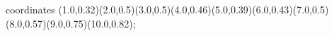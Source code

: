 					coordinates { (1.0,0.32)(2.0,0.5)(3.0,0.5)(4.0,0.46)(5.0,0.39)(6.0,0.43)(7.0,0.5)(8.0,0.57)(9.0,0.75)(10.0,0.82)};